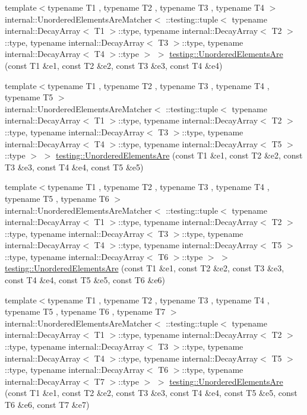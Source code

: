 \begin{DoxyCompactItemize}
\item 
{\footnotesize template$<$typename T1 , typename T2 , typename T3 , typename T4 $>$ }\\internal\+::\+Unordered\+Elements\+Are\+Matcher$<$ \+::testing\+::tuple$<$ typename internal\+::\+Decay\+Array$<$ T1 $>$\+::type, typename internal\+::\+Decay\+Array$<$ T2 $>$\+::type, typename internal\+::\+Decay\+Array$<$ T3 $>$\+::type, typename internal\+::\+Decay\+Array$<$ T4 $>$\+::type $>$ $>$ \hyperlink{namespacetesting_a8dfb2b88d0cacb8ececc069b0b015991}{testing\+::\+Unordered\+Elements\+Are} (const T1 \&e1, const T2 \&e2, const T3 \&e3, const T4 \&e4)
\item 
{\footnotesize template$<$typename T1 , typename T2 , typename T3 , typename T4 , typename T5 $>$ }\\internal\+::\+Unordered\+Elements\+Are\+Matcher$<$ \+::testing\+::tuple$<$ typename internal\+::\+Decay\+Array$<$ T1 $>$\+::type, typename internal\+::\+Decay\+Array$<$ T2 $>$\+::type, typename internal\+::\+Decay\+Array$<$ T3 $>$\+::type, typename internal\+::\+Decay\+Array$<$ T4 $>$\+::type, typename internal\+::\+Decay\+Array$<$ T5 $>$\+::type $>$ $>$ \hyperlink{namespacetesting_a5e0ff76eb3f61b6c79b60311ceca73d3}{testing\+::\+Unordered\+Elements\+Are} (const T1 \&e1, const T2 \&e2, const T3 \&e3, const T4 \&e4, const T5 \&e5)
\item 
{\footnotesize template$<$typename T1 , typename T2 , typename T3 , typename T4 , typename T5 , typename T6 $>$ }\\internal\+::\+Unordered\+Elements\+Are\+Matcher$<$ \+::testing\+::tuple$<$ typename internal\+::\+Decay\+Array$<$ T1 $>$\+::type, typename internal\+::\+Decay\+Array$<$ T2 $>$\+::type, typename internal\+::\+Decay\+Array$<$ T3 $>$\+::type, typename internal\+::\+Decay\+Array$<$ T4 $>$\+::type, typename internal\+::\+Decay\+Array$<$ T5 $>$\+::type, typename internal\+::\+Decay\+Array$<$ T6 $>$\+::type $>$ $>$ \hyperlink{namespacetesting_aff1859501ecd94dd1bc428d146a66fdc}{testing\+::\+Unordered\+Elements\+Are} (const T1 \&e1, const T2 \&e2, const T3 \&e3, const T4 \&e4, const T5 \&e5, const T6 \&e6)
\item 
{\footnotesize template$<$typename T1 , typename T2 , typename T3 , typename T4 , typename T5 , typename T6 , typename T7 $>$ }\\internal\+::\+Unordered\+Elements\+Are\+Matcher$<$ \+::testing\+::tuple$<$ typename internal\+::\+Decay\+Array$<$ T1 $>$\+::type, typename internal\+::\+Decay\+Array$<$ T2 $>$\+::type, typename internal\+::\+Decay\+Array$<$ T3 $>$\+::type, typename internal\+::\+Decay\+Array$<$ T4 $>$\+::type, typename internal\+::\+Decay\+Array$<$ T5 $>$\+::type, typename internal\+::\+Decay\+Array$<$ T6 $>$\+::type, typename internal\+::\+Decay\+Array$<$ T7 $>$\+::type $>$ $>$ \hyperlink{namespacetesting_add6e16fe24c45e39e92c0d19c04acf11}{testing\+::\+Unordered\+Elements\+Are} (const T1 \&e1, const T2 \&e2, const T3 \&e3, const T4 \&e4, const T5 \&e5, const T6 \&e6, const T7 \&e7)

\end{DoxyCompactItemize}
